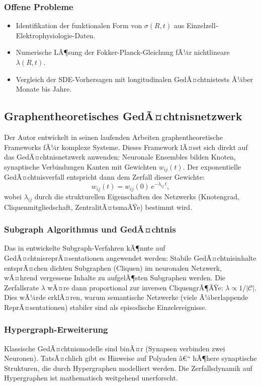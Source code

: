 ﻿\documentclass[12pt,a4paper,twoside]{article}
\theoremstyle{theormstyle}
\theoremstyle{proofstyle}
\begin{document}
	\subsubsection{Offene Probleme}
	\begin{itemize}
		\item Identifikation der funktionalen Form von $\sigma(R, t)$ aus
		Einzelzell-Elektrophysiologie-Daten.
		\item Numerische LÃ¶sung der Fokker-Planck-Gleichung fÃ¼r
		nichtlineare $\lambda(R,t)$.
		\item Vergleich der SDE-Vorhersagen mit longitudinalen GedÃ¤chtnistests
		Ã¼ber Monate bis Jahre.
	\end{itemize}
	
	\subsection{Graphentheoretisches GedÃ¤chtnisnetzwerk}
	
	Der Autor entwickelt in seinen laufenden Arbeiten
	\citep{epp2026subgraph,epp2026vadis} graphentheoretische Frameworks
	fÃ¼r komplexe Systeme. Dieses Framework lÃ¤sst sich direkt auf das
	GedÃ¤chtnisnetzwerk anwenden: Neuronale Ensembles bilden Knoten,
	synaptische Verbindungen Kanten mit Gewichten $w_{ij}(t)$.
	Der exponentielle GedÃ¤chtnisverfall entspricht dann dem Zerfall
	dieser Gewichte:
	\[
	w_{ij}(t) = w_{ij}(0)\,e^{-\lambda_{ij}\,t},
	\]
	wobei $\lambda_{ij}$ durch die strukturellen Eigenschaften des
	Netzwerks (Knotengrad, Cliquenmitgliedschaft, ZentralitÃ¤tsmaÃŸe)
	bestimmt wird.
	
	\subsubsection{Subgraph Algorithmus und GedÃ¤chtnis}
	Das in \citep{epp2026subgraph} entwickelte Subgraph-Verfahren kÃ¶nnte
	auf GedÃ¤chtnisreprÃ¤sentationen angewendet werden: Stabile GedÃ¤chtnisinhalte
	entsprÃ¤chen dichten Subgraphen (Cliquen) im neuronalen Netzwerk,
	wÃ¤hrend vergessene Inhalte zu aufgelÃ¶sten Subgraphen werden.
	Die Zerfallsrate $\lambda$ wÃ¤re dann proportional zur inversen CliquengrÃ¶ÃŸe:
	$\lambda \propto 1/|\mathcal{C}|$.
	Dies wÃ¼rde erklÃ¤ren, warum semantische Netzwerke (viele Ã¼berlappende
	ReprÃ¤sentationen) stabiler sind als episodische Einzelereignisse.
	
	\subsubsection{Hypergraph-Erweiterung}
	Klassische GedÃ¤chtnismodelle sind binÃ¤r (Synapsen verbinden zwei Neuronen).
	TatsÃ¤chlich gibt es Hinweise auf Polyaden â€“ hÃ¶here synaptische Strukturen,
	die durch Hypergraphen modelliert werden. Die Zerfallsdynamik auf
	Hypergraphen ist mathematisch weitgehend unerforscht.
	
\end{document}
